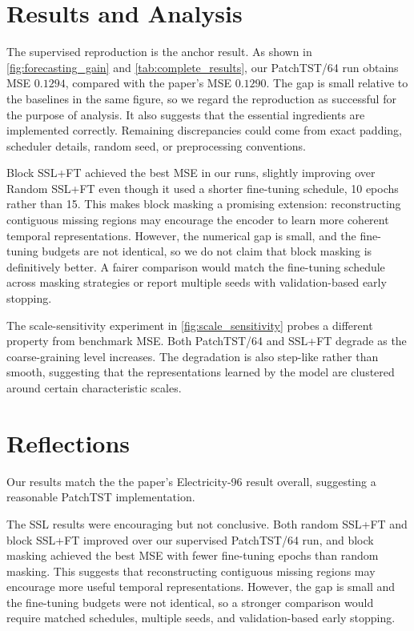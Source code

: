 \documentclass[11pt,twocolumn]{article}
\begin{document}
\section{Results and Analysis}
The supervised reproduction is the anchor result. As shown in \autoref{fig:forecasting_gain} and \autoref{tab:complete_results}, our PatchTST/64 run obtains MSE $0.1294$, compared with the paper's MSE $0.1290$. The gap is small relative to the baselines in the same figure, so we regard the reproduction as successful for the purpose of analysis. It also suggests that the essential ingredients are implemented correctly. Remaining discrepancies could come from exact padding, scheduler details, random seed, or preprocessing conventions.


Block SSL+FT achieved the best MSE in our runs, slightly improving over Random SSL+FT even though it used a shorter fine-tuning schedule, 10 epochs rather than 15. This makes block masking a promising extension: reconstructing contiguous missing regions may encourage the encoder to learn more coherent temporal representations. However, the numerical gap is small, and the fine-tuning budgets are not identical, so we do not claim that block masking is definitively better. A fairer comparison would match the fine-tuning schedule across masking strategies or report multiple seeds with validation-based early stopping.

The scale-sensitivity experiment in \autoref{fig:scale_sensitivity} probes a different property from benchmark MSE. Both PatchTST/64 and SSL+FT degrade as the coarse-graining level increases. The degradation is also step-like rather than smooth, suggesting that the representations learned by the model are clustered around certain characteristic scales. 



\section{Reflections}


Our results match the the paper's Electricity-96 result overall, suggesting a reasonable PatchTST implementation. 

The SSL results were encouraging but not conclusive. Both random SSL+FT and block SSL+FT improved over our supervised PatchTST/64 run, and block masking achieved the best MSE with fewer fine-tuning epochs than random masking. This suggests that reconstructing contiguous missing regions may encourage more useful temporal representations. However, the gap is small and the fine-tuning budgets were not identical, so a stronger comparison would require matched schedules, multiple seeds, and validation-based early stopping.
\end{document}
